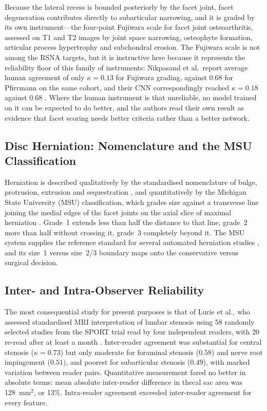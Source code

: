 Because the lateral recess is bounded posteriorly by the facet joint,
facet degeneration contributes directly to subarticular narrowing, and it is
graded by its own instrument---the four-point Fujiwara scale for facet joint
osteoarthritis, assessed on T1 and T2 images by joint space narrowing,
osteophyte formation, articular process hypertrophy and subchondral erosion.
The Fujiwara scale is not among the RSNA targets, but it is instructive here
because it represents the reliability floor of this family of instruments:
Nikpasand et al.\ report average human agreement of only $\kappa = 0.13$ for
Fujiwara grading, against 0.68 for Pfirrmann on the same cohort, and their CNN
correspondingly reached $\kappa = 0.18$ against 0.68
\cite{nikpasand2024automated}. Where the human instrument is that unreliable,
no model trained on it can be expected to do better, and the authors read their
own result as evidence that facet scoring needs better criteria rather than a
better network.

\subsection{Disc Herniation: Nomenclature and the MSU Classification}
\label{sec:lr-herniation-grading}

Herniation is described qualitatively by the standardised nomenclature of
bulge, protrusion, extrusion and sequestration \cite{fardon2014lumbar}, and
quantitatively by the Michigan State University (MSU) classification, which
grades size against a transverse line joining the medial edges of the facet
joints on the axial slice of maximal herniation \cite{mysliwiec2010msu}.
Grade~1 extends less than half the distance to that line, grade~2 more than
half without crossing it, grade~3 completely beyond it. The MSU system supplies
the reference standard for several automated herniation studies
\cite{zhang2023deep}, and its size~1 versus size~2/3 boundary maps onto the
conservative versus surgical decision.

\subsection{Inter- and Intra-Observer Reliability}
\label{sec:lr-reliability}

The most consequential study for present purposes is that of Lurie et al., who
assessed standardised MRI interpretation of lumbar stenosis using 58 randomly
selected studies from the SPORT trial read by four independent readers, with 20
re-read after at least a month \cite{lurie2008reliability}. Inter-reader
agreement was substantial for central stenosis ($\kappa = 0.73$) but only
moderate for foraminal stenosis ($0.58$) and nerve root impingement ($0.51$),
and poorest for subarticular stenosis ($0.49$), with marked variation between
reader pairs. Quantitative measurement fared no better in absolute terms: mean
absolute inter-reader difference in thecal sac area was 128~mm$^2$, or 13\%.
Intra-reader agreement exceeded inter-reader agreement for every feature.

